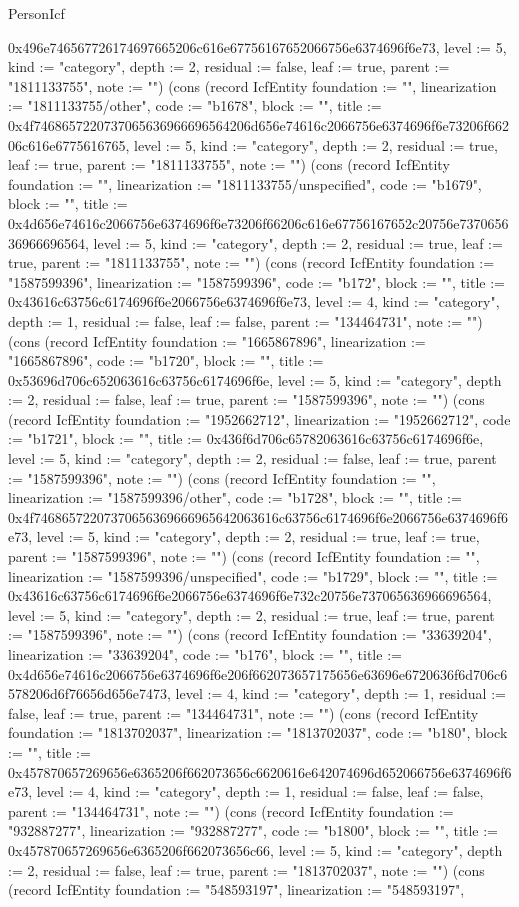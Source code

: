\begin{lexlean}{PersonIcf}
\begin{semanticmodule}
{0x496e746567726174697665206c616e67756167652066756e6374696f6e73, level := 5, kind := "category", depth := 2, residual := false, leaf := true, parent := "1811133755", note := ""}) (cons (record IcfEntity {foundation := "", linearization := "1811133755/other", code := "b1678", block := "", title := 0x4f7468657220737065636966696564206d656e74616c2066756e6374696f6e73206f66206c616e6775616765, level := 5, kind := "category", depth := 2, residual := true, leaf := true, parent := "1811133755", note := ""}) (cons (record IcfEntity {foundation := "", linearization := "1811133755/unspecified", code := "b1679", block := "", title := 0x4d656e74616c2066756e6374696f6e73206f66206c616e67756167652c20756e737065636966696564, level := 5, kind := "category", depth := 2, residual := true, leaf := true, parent := "1811133755", note := ""}) (cons (record IcfEntity {foundation := "1587599396", linearization := "1587599396", code := "b172", block := "", title := 0x43616c63756c6174696f6e2066756e6374696f6e73, level := 4, kind := "category", depth := 1, residual := false, leaf := false, parent := "134464731", note := ""}) (cons (record IcfEntity {foundation := "1665867896", linearization := "1665867896", code := "b1720", block := "", title := 0x53696d706c652063616c63756c6174696f6e, level := 5, kind := "category", depth := 2, residual := false, leaf := true, parent := "1587599396", note := ""}) (cons (record IcfEntity {foundation := "1952662712", linearization := "1952662712", code := "b1721", block := "", title := 0x436f6d706c65782063616c63756c6174696f6e, level := 5, kind := "category", depth := 2, residual := false, leaf := true, parent := "1587599396", note := ""}) (cons (record IcfEntity {foundation := "", linearization := "1587599396/other", code := "b1728", block := "", title := 0x4f74686572207370656369666965642063616c63756c6174696f6e2066756e6374696f6e73, level := 5, kind := "category", depth := 2, residual := true, leaf := true, parent := "1587599396", note := ""}) (cons (record IcfEntity {foundation := "", linearization := "1587599396/unspecified", code := "b1729", block := "", title := 0x43616c63756c6174696f6e2066756e6374696f6e732c20756e737065636966696564, level := 5, kind := "category", depth := 2, residual := true, leaf := true, parent := "1587599396", note := ""}) (cons (record IcfEntity {foundation := "33639204", linearization := "33639204", code := "b176", block := "", title := 0x4d656e74616c2066756e6374696f6e206f662073657175656e63696e6720636f6d706c6578206d6f76656d656e7473, level := 4, kind := "category", depth := 1, residual := false, leaf := true, parent := "134464731", note := ""}) (cons (record IcfEntity {foundation := "1813702037", linearization := "1813702037", code := "b180", block := "", title := 0x457870657269656e6365206f662073656c6620616e642074696d652066756e6374696f6e73, level := 4, kind := "category", depth := 1, residual := false, leaf := false, parent := "134464731", note := ""}) (cons (record IcfEntity {foundation := "932887277", linearization := "932887277", code := "b1800", block := "", title := 0x457870657269656e6365206f662073656c66, level := 5, kind := "category", depth := 2, residual := false, leaf := true, parent := "1813702037", note := ""}) (cons (record IcfEntity {foundation := "548593197", linearization := "548593197", }
\end{semanticmodule}
\end{lexlean}
